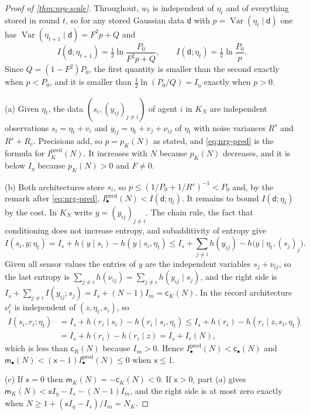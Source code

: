 \begin{proof}[Proof of \cref{thm:nrg-scale}]
Throughout, $w_t$ is independent of $\eta_t$ and of everything stored in round $t$, so for any stored Gaussian data $\mathsf d$ with $p=\operatorname{Var}(\eta_t\mid\mathsf d)$ one has $\operatorname{Var}(\eta_{t+1}\mid\mathsf d)=F^2p+Q$ and
\begin{equation}\label{eq:nrg-pred}
I(\mathsf d;\eta_{t+1})=\tfrac12\ln\frac{P_0}{F^2p+Q},\qquad I(\mathsf d;\eta_t)=\tfrac12\ln\frac{P_0}{p}.
\end{equation}
Since $Q=(1-F^2)P_0$, the first quantity is smaller than the second exactly when $p<P_0$, and it is smaller than $\tfrac12\ln(P_0/Q)=I_\eta$ exactly when $p>0$.

(a) Given $\eta_t$, the data $(s_i,(y_{ij})_{j\ne i})$ of agent $i$ in $K_N$ are independent observations $s_i=\eta_t+v_i$ and $y_{ij}=\eta_t+v_j+\nu_{ij}$ of $\eta_t$ with noise variances $R^s$ and $R^s+R_c$. Precisions add, so $p=p_K(N)$ as stated, and \cref{eq:nrg-pred} is the formula for $I^{\mathrm{pred}}_K(N)$. It increases with $N$ because $p_K(N)$ decreases, and it is below $I_\eta$ because $p_K(N)>0$ and $F\ne0$.

(b) Both architectures store $s_i$, so $p\le(1/P_0+1/R^s)^{-1}<P_0$ and, by the remark after \cref{eq:nrg-pred}, $I^{\mathrm{pred}}_\bullet(N)<I(\mathsf d;\eta_t)$. It remains to bound $I(\mathsf d;\eta_t)$ by the cost. In $K_N$ write $y=(y_{ij})_{j\ne i}$. The chain rule, the fact that conditioning does not increase entropy, and subadditivity of entropy give
\[
I(s_i,y;\eta_t)=I_s+h(y\mid s_i)-h(y\mid s_i,\eta_t)\le I_s+\sum_{j\ne i}h(y_{ij})-h\bigl(y\mid\eta_t,(s_j)_j\bigr).
\]
Given all sensor values the entries of $y$ are the independent variables $s_j+\nu_{ij}$, so the last entropy is $\sum_{j\ne i}h(\nu_{ij})=\sum_{j\ne i}h(y_{ij}\mid s_j)$, and the right side is $I_s+\sum_{j\ne i}I(y_{ij};s_j)=I_s+(N-1)I_m=\mathsf c_K(N)$. In the record architecture $\nu^r_i$ is independent of $(z,\eta_t,s_i)$, so
\begin{align*}
I(s_i,r_i;\eta_t)&=I_s+h(r_i\mid s_i)-h(r_i\mid s_i,\eta_t)\le I_s+h(r_i)-h(r_i\mid z,s_i,\eta_t)\\
&=I_s+h(r_i)-h(r_i\mid z)=I_s+I_r(N),
\end{align*}
which is less than $\mathsf c_R(N)$ because $I_m>0$. Hence $I^{\mathrm{pred}}_\bullet(N)<\mathsf c_\bullet(N)$ and $\mathsf m_\bullet(N)<(\mathsf x-1)I^{\mathrm{pred}}_\bullet(N)\le0$ when $\mathsf x\le1$.

(c) If $\mathsf x=0$ then $\mathsf m_K(N)=-\mathsf c_K(N)<0$. If $\mathsf x>0$, part (a) gives $\mathsf m_K(N)<\mathsf xI_\eta-I_s-(N-1)I_m$, and the right side is at most zero exactly when $N\ge1+(\mathsf xI_\eta-I_s)/I_m=N_K$.


\end{proof}
